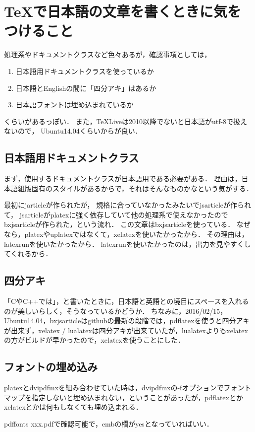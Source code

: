 \section{{\TeX}で日本語の文章を書くときに気をつけること} \label{sec:no1}

処理系やドキュメントクラスなど色々あるが，確認事項としては，

\begin{enumerate}
 \item 日本語用ドキュメントクラスを使っているか
 \item 日本語とEnglishの間に「四分アキ」はあるか
 \item 日本語フォントは埋め込まれているか
\end{enumerate}

くらいがあるっぽい．
また，{\TeX}Liveは2010以降でないと日本語がutf-8で扱えないので，
Ubuntu14.04くらいからが良い．

\subsection{日本語用ドキュメントクラス}

まず，使用するドキュメントクラスが日本語用である必要がある．
理由は，日本語組版固有のスタイルがあるからで，それはそんなものかなという気がする．

最初にjarticleが作られたが，
規格に合っていなかったみたいでjsarticleが作られて，
jsarticleがplatexに強く依存していて他の処理系で使えなかったのでbxjsarticleが作られた，という流れ．
この文章はbxjsarticleを使っている．
なぜなら，platexやuplatexではなくて，xelatexを使いたかったから．
その理由は，latexrunを使いたかったから．
latexrunを使いたかったのは，出力を見やすくしてくれるから．

\subsection{四分アキ}

「CやC++では」，と書いたときに，日本語と英語との境目にスペースを入れるのが美しいらしく，そうなっているかどうか．
ちなみに，2016/02/15，Ubuntu14.04，bxjsarticleはgithubの最新の段階では，pdflatexを使うと四分アキが出来ず，xelatex / lualatexは四分アキが出来ていたが，lualatexよりもxelatexの方がビルドが早かったので，xelatexを使うことにした．

\subsection{フォントの埋め込み}
platexとdvipdfmxを組み合わせていた時は，dvipdfmxの-fオプションでフォントマップを指定しないと埋め込まれない，ということがあったが，pdflatexとかxelatexとかは何もしなくても埋め込まれる．

pdffonts xxx.pdfで確認可能で，embの欄がyesとなっていればいい．
